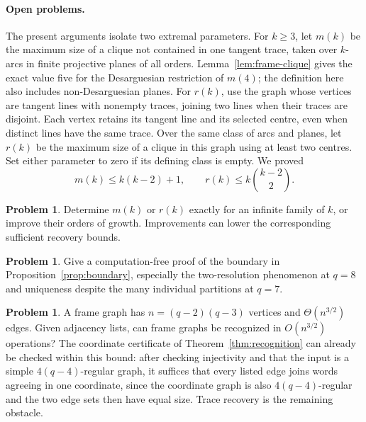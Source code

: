 \documentclass[11pt]{article}
\theoremstyle{definition}
\newtheorem{problem}[theorem]{Problem}
\theoremstyle{remark}
\begin{document}
\paragraph{Open problems.}
The present arguments isolate two extremal parameters. For $k\ge3$, let
$m(k)$ be the maximum size of a clique not contained in one tangent
trace, taken over $k$-arcs in finite projective planes of all orders.
Lemma~\ref{lem:frame-clique} gives the exact value five for the
Desarguesian restriction of $m(4)$; the definition here also includes
non-Desarguesian planes. For $r(k)$, use the graph whose vertices are
tangent lines with nonempty traces, joining two lines when their traces
are disjoint. Each vertex retains its tangent line and its selected centre,
even when distinct lines have the same trace. Over the same class of arcs
and planes, let $r(k)$ be the maximum size of a clique in this graph
using at least two centres. Set either parameter to zero
if its defining class is empty. We proved
\[
 m(k)\leq k(k-2)+1,
 \qquad
 r(k)\leq k\binom{k-2}{2}.
\]

\begin{problem}\label{prob:extremal}
Determine $m(k)$ or $r(k)$ exactly for an infinite family of $k$, or improve
their orders of growth.  Improvements can lower the corresponding
sufficient recovery bounds.
\end{problem}

\begin{problem}\label{prob:boundary-proof}
Give a computation-free proof of the boundary in
Proposition~\ref{prop:boundary}, especially the two-resolution phenomenon
at $q=8$ and uniqueness despite the many individual partitions at $q=7$.
\end{problem}

\begin{problem}\label{prob:list-recognition}
A frame graph has $n=(q-2)(q-3)$ vertices and $\Theta(n^{3/2})$ edges.
Given adjacency lists, can frame graphs be recognized in $O(n^{3/2})$
operations? The coordinate certificate of
Theorem~\ref{thm:recognition} can already be checked within this bound:
after checking injectivity and that the input is a simple
$4(q-4)$-regular graph, it
suffices that every listed edge joins words agreeing in one coordinate,
since the coordinate graph is also $4(q-4)$-regular and the two edge
sets then have equal size. Trace recovery is the
remaining obstacle.
\end{problem}
\end{document}
